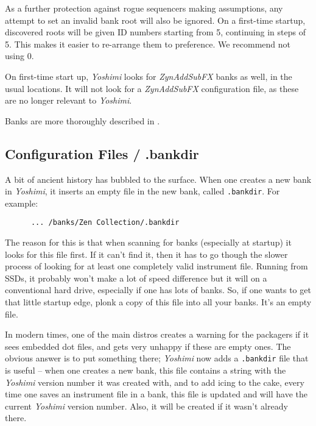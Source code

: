    As a further protection against rogue sequencers making assumptions, any
   attempt to set an invalid bank root will also be ignored.  On a
   first-time startup, discovered roots will be given ID numbers starting from 5,
   continuing in steps of 5. This makes it easier to re-arrange them to
   preference. We recommend not using 0.

   On first-time start up, \textsl{Yoshimi}
   looks for \textsl{ZynAddSubFX} banks as well, in the usual locations.
   It will not look for a \textsl{ZynAddSubFX} configuration file, as these
   are no longer relevant to \textsl{Yoshimi}.

   Banks are more thoroughly described in
   .

\subsection{Configuration Files / .bankdir}
\label{subsec:configuration_bankdir}

   A bit of ancient history has bubbled to the surface.
   When one creates a new bank in \textsl{Yoshimi}, it inserts an empty file in
   the new bank, called \texttt{.bankdir}.  For example:

   \begin{verbatim}
      ... /banks/Zen Collection/.bankdir
   \end{verbatim}

   The reason for this is that when scanning for banks (especially at startup) it
   looks for this file first. If it can't find it, then it has to go though the
   slower process of looking for at least one completely valid instrument file.
   Running from SSDs, it probably won't make a lot of speed difference but it
   will on a conventional hard drive, especially if one has lots of banks.  So,
   if one wants to get that little startup edge, plonk a copy of this file into
      all your banks.  It's an empty file.

   In modern times, one of the main distros creates a warning for the packagers
   if it sees embedded dot files, and gets very unhappy if these are empty ones.
   The obvious answer is to put something there; \textsl{Yoshimi} now adds a
   \texttt{.bankdir} file that is useful -- when one creates a new bank, this
   file contains a string with the \textsl{Yoshimi} version number it was
   created with, and to add icing to the cake, every time one saves an
   instrument file in a bank, this file is updated and will have the current
   \textsl{Yoshimi} version number. Also, it will be created if it wasn't
   already there.

